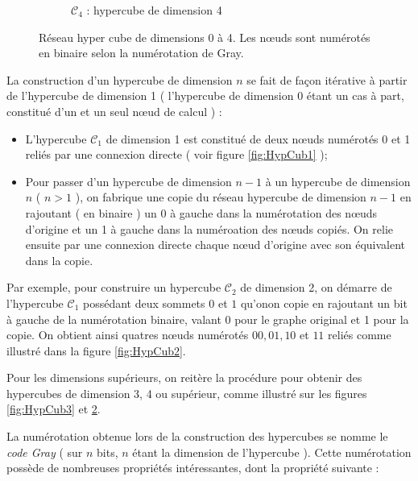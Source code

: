 \documentclass[fleqn,11pt]{article}
\begin{document}
\begin{itemize}
\begin{itemize}
\begin{figure}[h]
\begin{subfigure}[c]{0.46\textwidth}
\caption{$\mathcal{C}_{4}$ : hypercube de dimension 4}\label{fig:HypCub4}
\end{subfigure}
\caption{Réseau hyper cube de dimensions 0 à 4. Les nœuds sont numérotés en binaire selon la numérotation de Gray.}
\end{figure}

La construction d'un hypercube de dimension $n$ se fait de façon itérative à partir de l'hypercube de
dimension 1 ( l'hypercube de dimension 0 étant un cas à part, constitué d'un et un seul nœud de calcul ) :

\begin{itemize}
\item L'hypercube $\mathcal{C}_{1}$ de dimension 1 est constitué de deux nœuds numérotés 0 et 1 
reliés par une connexion directe ( voir figure \ref{fig:HypCub1} );
\item Pour passer d'un hypercube de dimension $n-1$ à un hypercube de dimension $n$ ( $n>1$ ), on fabrique
une copie du réseau hypercube de dimension $n-1$ en rajoutant ( en binaire ) un 0 à gauche dans la numérotation
des nœuds d'origine et un 1 à gauche dans la numéroation des nœuds copiés. On relie ensuite par une
connexion directe chaque nœud d'origine avec son équivalent dans la copie.
\end{itemize}

Par exemple, pour construire un hypercube $\mathcal{C}_{2}$ de dimension 2, 
on démarre de l'hypercube $\mathcal{C}_{1}$ possédant deux sommets $0$ et $1$
qu'onon copie en rajoutant un bit à gauche de la numérotation binaire, valant 0 pour le graphe original et
1 pour la copie. On obtient ainsi quatres nœuds numérotés $00,01,10$ et $11$
reliés comme illustré dans la figure \ref{fig:HypCub2}.

Pour les dimensions supérieurs, on reitère la procédure pour obtenir des hypercubes de dimension
3, 4 ou supérieur, comme illustré sur les figures \ref{fig:HypCub3} et \ref{fig:HypCub4}.

La numérotation obtenue lors de la construction des hypercubes se nomme le \textsl{code Gray} ( sur $n$
bits, $n$ étant la dimension de l'hypercube ). Cette numérotation possède de nombreuses propriétés
intéressantes, dont la propriété suivante :


\end{itemize}
\end{itemize}
\end{document}
